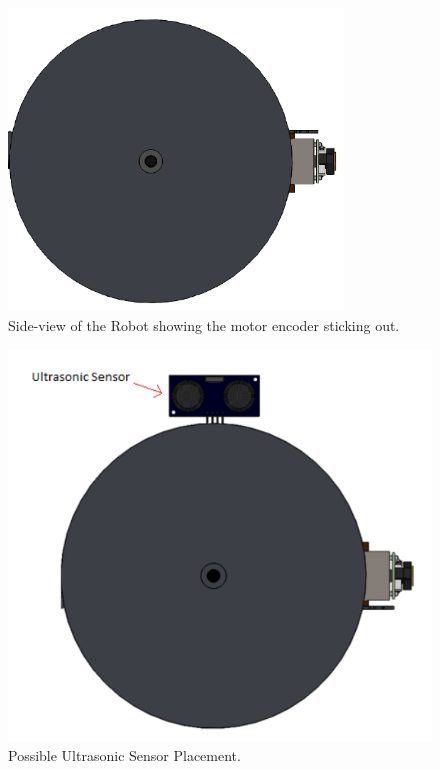 \documentclass[ece]{uw-wkrpt}
\begin{document}
\begin{figure}[!htb]
    \centering
    \includegraphics[width=3.5in]{res/mech1}
    \caption[Side-view of the Robot showing the motor encoder]
          {Side-view of the Robot showing the motor encoder sticking out.}
    \label{fig:mech1}
\end{figure}

\break

\begin{figure}[!htb]
    \centering
    \includegraphics[width=4.5in]{res/mech2}
    \caption[Possible Ultrasonic Sensor Placement]
          {Possible Ultrasonic Sensor Placement.}
    \label{fig:mech2}
\end{figure}
\end{document}
